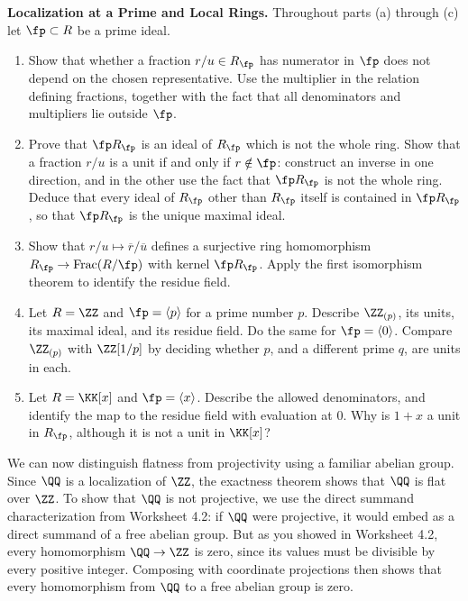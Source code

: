 \documentclass[12pt,reqno]{amsart}
\DeclareMathOperator{\Frac}{Frac}
\begin{document}
\begin{problems}
\item\label{t:prime} \textbf{Localization at a Prime and Local Rings.} Throughout parts (a) through (c) let $\fp\subset R$ be a prime ideal.
\begin{enumerate}
\item Show that whether a fraction $r/u\in R_{\fp}$ has numerator in $\fp$ does not depend on the chosen representative. Use the multiplier in the relation defining fractions, together with the fact that all denominators and multipliers lie outside $\fp$.
\item Prove that $\fp R_{\fp}$ is an ideal of $R_{\fp}$ which is not the whole ring. Show that a fraction $r/u$ is a unit if and only if $r\notin\fp$: construct an inverse in one direction, and in the other use the fact that $\fp R_{\fp}$ is not the whole ring. Deduce that every ideal of $R_{\fp}$ other than $R_{\fp}$ itself is contained in $\fp R_{\fp}$, so that $\fp R_{\fp}$ is the unique maximal ideal.
\item Show that $r/u\mapsto\overline r/\overline u$ defines a surjective ring homomorphism $R_{\fp}\to\Frac(R/\fp)$ with kernel $\fp R_{\fp}$. Apply the first isomorphism theorem to identify the residue field.
\item Let $R=\ZZ$ and $\fp=\langle p\rangle$ for a prime number $p$. Describe $\ZZ_{(p)}$, its units, its maximal ideal, and its residue field. Do the same for $\fp=\langle0\rangle$. Compare $\ZZ_{(p)}$ with $\ZZ[1/p]$ by deciding whether $p$, and a different prime $q$, are units in each.
\item Let $R=\KK[x]$ and $\fp=\langle x\rangle$. Describe the allowed denominators, and identify the map to the residue field with evaluation at $0$. Why is $1+x$ a unit in $R_{\fp}$, although it is not a unit in $\KK[x]$?
\end{enumerate}
\end{problems}

\hrulefill

We can now distinguish flatness from projectivity using a familiar abelian group. Since $\QQ$ is a localization of $\ZZ$, the exactness theorem shows that $\QQ$ is flat over $\ZZ$. To show that $\QQ$ is not projective, we use the direct summand characterization from Worksheet 4.2: if $\QQ$ were projective, it would embed as a direct summand of a free abelian group. But as you showed in Worksheet 4.2, every homomorphism $\QQ\to\ZZ$ is zero, since its values must be divisible by every positive integer. Composing with coordinate projections then shows that every homomorphism from $\QQ$ to a free abelian group is zero.
\end{document}
